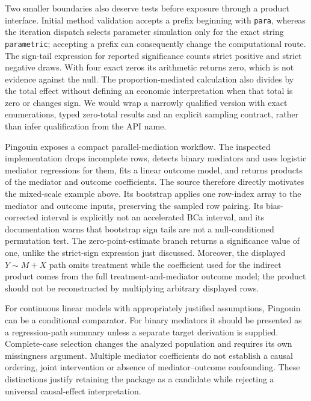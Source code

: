 Two smaller boundaries also deserve tests before exposure through a product interface. Initial method validation accepts a prefix beginning with \texttt{para}, whereas the iteration dispatch selects parameter simulation only for the exact string \texttt{parametric}; accepting a prefix can consequently change the computational route. The sign-tail expression for reported significance counts strict positive and strict negative draws. With four exact zeros its arithmetic returns zero, which is not evidence against the null. The proportion-mediated calculation also divides by the total effect without defining an economic interpretation when that total is zero or changes sign. We would wrap a narrowly qualified version with exact enumerations, typed zero-total results and an explicit sampling contract, rather than infer qualification from the API name. \citep{exec25_pymed_statsmodels,exec25_pymed_choice}

Pingouin exposes a compact parallel-mediation workflow. The inspected implementation drops incomplete rows, detects binary mediators and uses logistic mediator regressions for them, fits a linear outcome model, and returns products of the mediator and outcome coefficients. The source therefore directly motivates the mixed-scale example above. Its bootstrap applies one row-index array to the mediator and outcome inputs, preserving the sampled row pairing. Its bias-corrected interval is explicitly not an accelerated BCa interval, and its documentation warns that bootstrap sign tails are not a null-conditioned permutation test. The zero-point-estimate branch returns a significance value of one, unlike the strict-sign expression just discussed. Moreover, the displayed $Y\sim M+X$ path omits treatment while the coefficient used for the indirect product comes from the full treatment-and-mediator outcome model; the product should not be reconstructed by multiplying arbitrary displayed rows. \citep{exec25_pymed_pingouin}

For continuous linear models with appropriately justified assumptions, Pingouin can be a conditional comparator. For binary mediators it should be presented as a regression-path summary unless a separate target derivation is supplied. Complete-case selection changes the analyzed population and requires its own missingness argument. Multiple mediator coefficients do not establish a causal ordering, joint intervention or absence of mediator--outcome confounding. These distinctions justify retaining the package as a candidate while rejecting a universal causal-effect interpretation. \citep{exec25_pymed_pingouin,exec25_pymed_choice}

